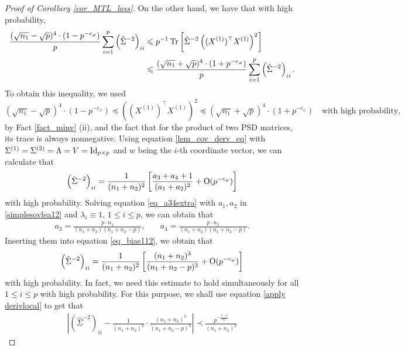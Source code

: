 \begin{proof}[Proof of Corollary \ref{cor_MTL_loss}]
On the other hand, we have that with high probability,
\begin{align}
 \frac{(\sqrt{n_1}-\sqrt{p})^4 \cdot (1- p^{-c_\varphi})}{p}\sum_{i=1}^p \left(\hat \Sigma^{-2}\right)_{ii}  &\leqslant {p}^{-1}\operatorname{Tr}\left[\hat\Sigma^{-2} \left((X^{(1)})^\top X^{(1)} \right)^2\right] \label{eq_bias111}\\ 
 &\leqslant \frac{(\sqrt{n_1}+\sqrt{p})^4 \cdot (1+ p^{-c_\varphi})}{p}\sum_{i=1}^p \left(\hat\Sigma^{-2}\right)_{ii} .\nonumber
\end{align}
To obtain this inequality, we used  
$$ (\sqrt{n_1}-\sqrt{p})^4 \cdot (1-p^{-c_\varphi}) \preceq \left((X^{(1)})^\top X^{(1)} \right)^2 \preceq (\sqrt{n_1}+\sqrt{p})^4 \cdot (1+ p^{-c_\varphi}) \quad \text{with high probability},$$
by Fact \ref{fact_minv} (ii), and the fact that for the product of two PSD matrices, its trace is always nonnegative.
Using equation \eqref{lem_cov_derv_eq} with $\Sigma^{(1)}=\Sigma^{(2)}=\Lambda=V=\operatorname{Id}_{p\times p}$ and $w$ being the $i$-th coordinate vector, we can calculate that 
\begin{align}\label{eq_bias112}
 \left(\hat\Sigma^{-2}\right)_{ii} = \frac{1}{(n_1+n_2)^2} \left[\frac{a_3+a_4+1}{(a_1+a_2)^2} +\operatorname{O}(p^{-c_\varphi})\right]
\end{align}
with high probability. Solving equation \eqref{eq_a34extra} with $a_1, a_2$ in \eqref{simplesovlea12} and $\lambda_i\equiv 1$, $1\le i\le p$, we can obtain that
	\begin{align*}
		a_3 = \frac{p\cdot n_1}{(n_1 +n_2)(n_1 +n_2 - p)}, \quad
		&  a_4 = \frac{p\cdot n_2}{(n_1 + n_2)(n_1 + n_2 - p)}. %
	\end{align*}
Inserting them into equation \eqref{eq_bias112}, we obtain that 
\begin{align*}%
 \left(\hat\Sigma^{-2}\right)_{ii} =  \frac{1}{(n_1+n_2)^2} \left[  \frac{ (n_1+n_2)^3 }{(n_1+n_2-p)^3} +\OO(p^{-c_\varphi})\right]
\end{align*}
with high probability. In fact, we need this estimate to hold simultaneously for all $1\le i \le p$ with high probability. For this purpose, we shall use equation \eqref{apply derivlocal} to get that 
\begin{align*}%
\left| \left(\hat\Sigma^{-2}\right)_{ii} - \frac{1}{(n_1+n_2)^2}\cdot \frac{(n_1+n_2)^3}{(n_1+n_2-p)^3}\right|\prec \frac{p^{-\frac{\varphi-4}{2\varphi}}}{(n_1+n_2)^2}

\end{align*}
\end{proof}
